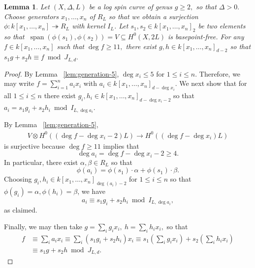 \documentclass{amsart}
\theoremstyle{plain}
\newtheorem{lem}[thm]{Lemma}
\theoremstyle{definition}
\theoremstyle{remark}
\numberwithin{equation}{section}
\newcommand{\halfcan}{L}
\DeclareMathOperator{\newspan}{span}
\begin{document}
\begin{lem}
\label{lem:reducing-degree}
Let $(X, \Delta, \halfcan)$ be a log spin curve of genus $g \geq 2,$ so
that $\Delta > 0.$ Choose generators $x_1, \ldots, x_n$ of $R_\halfcan$ so
that we obtain a surjection $\phi: k[x_1, \ldots, x_n]
\twoheadrightarrow R_\halfcan$ with kernel $I_L$. Let $s_1, s_2 \in k[x_1,
\ldots, x_n]_2$ be two elements so that $\: \newspan(\phi(s_1), \phi(s_2))
= V \subseteq H^0(X, 2\halfcan)$ is basepoint-free. For any $f \in
k[x_1, \ldots, x_n]$ such that $\deg f \geq 11,$ there exist $g, h \in
k[x_1, \ldots, x_n]_{d - 2}$ so that $s_1 g + s_2 h \equiv f \bmod J_{\halfcan, d}.$
\end{lem}
\begin{proof}
By Lemma ~\ref{lem:generation-5}, $\deg x_i \leq 5$ for $1 \leq i \leq n$. Therefore, we may write $f = \sum_{i = 1}^{n}a_i x_i$ with $a_i \in k[x_1, \ldots, x_n]_{d-\deg x_i}$.
We next show that for all $1 \leq i \leq n$ there exist $g_i, h_i \in k[x_1, \ldots, x_n]_{d - \deg x_i - 2}$ so that $a_i = s_1g_i + s_2h_i \bmod I_{\halfcan, \deg a_i}.$ 

By Lemma ~\ref{lem:generation-5},
\begin{align*}
	V \otimes H^0((\deg f-\deg x_i -2)\halfcan) \rightarrow H^0((\deg f-\deg x_i)\halfcan)
\end{align*}
is surjective because $\deg f \geq 11$ implies that
$$\deg a_i =\deg f - \deg x_i -2 \geq 4.$$
In particular, there exist $\alpha, \beta \in R_L$ so that
$$\phi(a_i) = \phi(s_1) \cdot \alpha + \phi(s_1) \cdot \beta.$$ 
Choosing $g_i,h_i\in k[x_1, \ldots, x_n]_{\deg(a_i)-2}$ for $1 \leq i \leq n$ so that $\phi(g_i) = \alpha, \phi(h_i) = \beta$, we have 
$$a_i \equiv s_1 g_i + s_2 h_i \bmod I_{\halfcan, \deg a_i},$$ as claimed.

Finally, we may then take $g = \sum_{i}^{}g_i x_i, \: h = \sum_{i}^{}h_i x_i,$ so that 
\begin{align*}
	f &\equiv \sum_{i}^{}a_i x_i \equiv \sum_{i}^{}(s_1g_i + s_2h_i)x_i \equiv s_1 \left( \sum_{i}^{}g_i x_i \right) + s_2 \left( \sum_{i}^{}h_i x_i \right) \\
	&\equiv s_1 g + s_2 h \bmod J_{L,d}.
\end{align*}
\end{proof}
\end{document}
